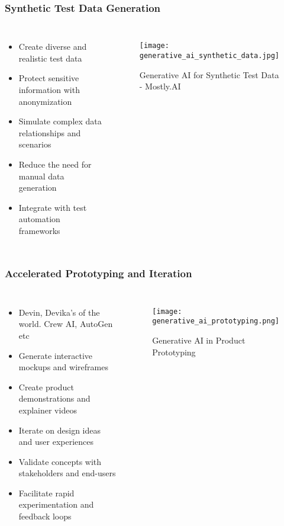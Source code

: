 \begin{frame}[fragile]\frametitle{Synthetic Test Data Generation}
\begin{columns}
\begin{itemize}
    \item Create diverse and realistic test data
    \item Protect sensitive information with anonymization
    \item Simulate complex data relationships and scenarios
    \item Reduce the need for manual data generation
    \item Integrate with test automation frameworks
\end{itemize}
\begin{figure}
    \texttt{[image: generative\_ai\_synthetic\_data.jpg]}
    \caption{Generative AI for Synthetic Test Data - Mostly.AI}
\end{figure}
\end{columns}
\end{frame}

\begin{frame}[fragile]\frametitle{Accelerated Prototyping and Iteration}
\begin{columns}
\begin{itemize}
	\item Devin, Devika's of the world. Crew AI, AutoGen etc
    \item Generate interactive mockups and wireframes
    \item Create product demonstrations and explainer videos
    \item Iterate on design ideas and user experiences
    \item Validate concepts with stakeholders and end-users
    \item Facilitate rapid experimentation and feedback loops
\end{itemize}
\begin{figure}
    \texttt{[image: generative\_ai\_prototyping.png]}
    \caption{Generative AI in Product Prototyping}
\end{figure}
\end{columns}
\end{frame}


